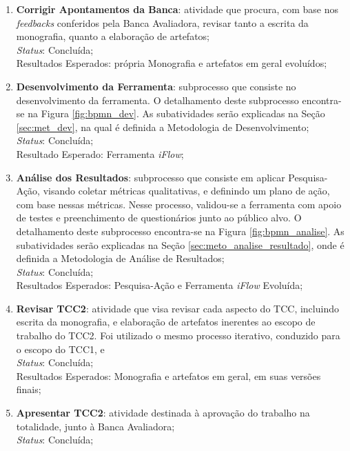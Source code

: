 \begin{enumerate}
    \item \textbf{Corrigir Apontamentos da Banca}: atividade que procura, com base nos \textit{feedbacks} conferidos pela Banca Avaliadora, revisar tanto a escrita da monografia, quanto a elaboração de artefatos;
    \\
    \textit{Status}: Concluída;
    \\
    Resultados Esperados: própria Monografia e artefatos em geral evoluídos;
    
    \item \textbf{Desenvolvimento da Ferramenta}: subprocesso que consiste no desenvolvimento da ferramenta. O detalhamento deste subprocesso encontra-se na Figura \ref{fig:bpmn_dev}. As subatividades serão explicadas na Seção \ref{sec:met_dev}, na qual é definida a Metodologia de Desenvolvimento;
    \\
    \textit{Status}: Concluída;
    \\
    Resultado Esperado: Ferramenta \textit{iFlow};
    \item \textbf{Análise dos Resultados}: subprocesso que consiste em aplicar Pesquisa-Ação, visando coletar métricas qualitativas, e definindo um plano de ação, com base nessas métricas. Nesse processo, validou-se a ferramenta com apoio de testes e preenchimento de questionários junto ao público alvo. O detalhamento deste subprocesso encontra-se na Figura \ref{fig:bpmn_analise}. As subatividades serão explicadas na Seção \ref{sec:meto_analise_resultado}, onde é definida a Metodologia de Análise de Resultados;
    \\
    \textit{Status}: Concluída;
    \\
    Resultados Esperados: Pesquisa-Ação e Ferramenta \textit{iFlow} Evoluída;
    \item \textbf{Revisar TCC2}: atividade que visa revisar cada aspecto do TCC, incluindo escrita da monografia, e elaboração de artefatos inerentes ao escopo de trabalho do TCC2. Foi utilizado o mesmo processo iterativo, conduzido para o escopo do TCC1, e
    \\
    \textit{Status}: Concluída;
    \\
    Resultados Esperados: Monografia e artefatos em geral, em suas versões finais;
    \item \textbf{Apresentar TCC2}: atividade destinada à aprovação do trabalho na totalidade, junto à Banca Avaliadora;
    \\
    \textit{Status}: Concluída;
\end{enumerate}


